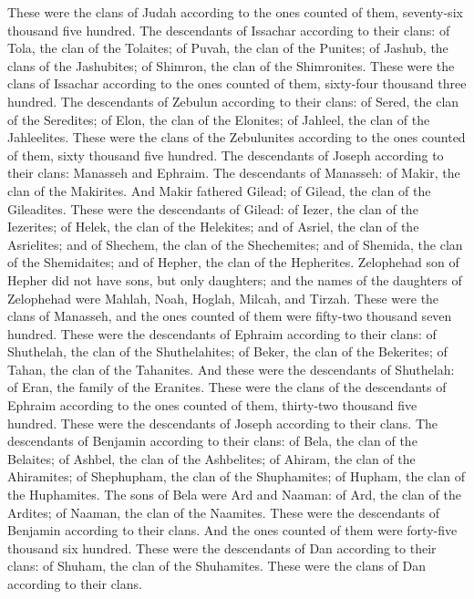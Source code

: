 \begin{biblechapter}
\verse These were the clans of Judah according to the ones counted of them, seventy-six thousand five hundred.
\verse The descendants of Issachar according to their clans: of Tola, the clan of the Tolaites; of Puvah, the clan of the Punites;
\verse of Jashub, the clans of the Jashubites; of Shimron, the clan of the Shimronites.
\verse These were the clans of Issachar according to the ones counted of them, sixty-four thousand three hundred.
\verse The descendants of Zebulun according to their clans: of Sered, the clan of the Seredites; of Elon, the clan of the Elonites; of Jahleel, the clan of the Jahleelites.
\verse These were the clans of the Zebulunites according to the ones counted of them, sixty thousand five hundred.
\verse The descendants of Joseph according to their clans: Manasseh and Ephraim.
\verse The descendants of Manasseh: of Makir, the clan of the Makirites. And Makir fathered Gilead; of Gilead, the clan of the Gileadites.
\verse These were the descendants of Gilead: of Iezer, the clan of the Iezerites; of Helek, the clan of the Helekites;
\verse and of Asriel, the clan of the Asrielites; and of Shechem, the clan of the Shechemites;
\verse and of Shemida, the clan of the Shemidaites; and of Hepher, the clan of the Hepherites.
\verse Zelophehad son of Hepher did not have sons, but only daughters; and the names of the daughters of Zelophehad were Mahlah, Noah, Hoglah, Milcah, and Tirzah.
\verse These were the clans of Manasseh, and the ones counted of them were fifty-two thousand seven hundred.
\verse These were the descendants of Ephraim according to their clans: of Shuthelah, the clan of the Shuthelahites; of Beker, the clan of the Bekerites; of Tahan, the clan of the Tahanites.
\verse And these were the descendants of Shuthelah: of Eran, the family of the Eranites.
\verse These were the clans of the descendants of Ephraim according to the ones counted of them, thirty-two thousand five hundred. These were the descendants of Joseph according to their clans.
\verse The descendants of Benjamin according to their clans: of Bela, the clan of the Belaites; of Ashbel, the clan of the Ashbelites; of Ahiram, the clan of the Ahiramites;
\verse of Shephupham, the clan of the Shuphamites; of Hupham, the clan of the Huphamites.
\verse The sons of Bela were Ard and Naaman: of Ard, the clan of the Ardites; of Naaman, the clan of the Naamites.
\verse These were the descendants of Benjamin according to their clans. And the ones counted of them were forty-five thousand six hundred.
\verse These were the descendants of Dan according to their clans: of Shuham, the clan of the Shuhamites. These were the clans of Dan according to their clans.

\end{biblechapter}
